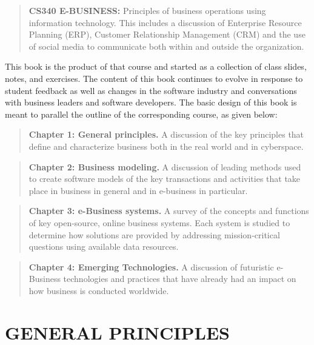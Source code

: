 \documentclass[]{book}
\begin{document}
\begin{quote}
\textbf{CS340 E-BUSINESS:} Principles of business operations using information technology. This includes a discussion of Enterprise Resource Planning (ERP), Customer Relationship Management (CRM) and the use of social media to communicate both within and outside the organization.
\end{quote}

This book is the product of that course and started as a collection of class slides, notes, and exercises. The content of this book continues to evolve in response to student feedback as well as changes in the software industry and conversations with business leaders and software developers. The basic design of this book is meant to parallel the outline of the corresponding course, as given below:

\begin{quote}
\textbf{Chapter 1: General principles.} A discussion of the key principles that define and characterize business both in the real world and in cyberspace.
\end{quote}

\begin{quote}
\textbf{Chapter 2: Business modeling.} A discussion of leading methods used to create software models of the key transactions and activities that take place in business in general and in e-business in particular.
\end{quote}

\begin{quote}
\textbf{Chapter 3: e-Business systems.} A survey of the concepts and functions of key open-source, online business systems. Each system is studied to determine how solutions are provided by addressing mission-critical questions using available data resources.
\end{quote}

\begin{quote}
\textbf{Chapter 4: Emerging Technologies.} A discussion of futuristic e-Business technologies and practices that have already had an impact on how business is conducted worldwide.
\end{quote}

\mainmatter

\hypertarget{general-principles}{%
\chapter{GENERAL PRINCIPLES}\label{general-principles}}
\end{document}
